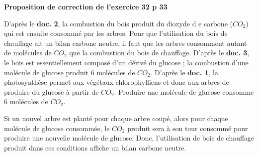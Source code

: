 	\begin{center}
		{\LARGE \textbf{Proposition de correction de l'exercice 32 p 33}}
	\end{center}
	
	
	D'après le \textbf{doc. 2}, la combustion du bois produit du dioxyde d e carbone ($CO_2$) qui est ensuite consommé par les arbres. Pour que l'utilisation du bois de chauffage ait un bilan carbone neutre, il faut que les arbres consomment autant de molécules de $CO_2$ que la combustion du bois de chauffage.	
	D'après le \textbf{doc. 3}, le bois est essentiellement composé d'un dérivé du glucose ; la combustion d'une molécule de glucose produit 6 molécules de $CO_2$. 
	D'après le \textbf{doc. 1}, la photosynthèse permet aux végétaux chlorophylliens et donc aux arbres de produire du glucose à partir de $CO_2$. Produire une molécule de glucose consomme 6 molécules de $CO_2$.
	
	Si un nouvel arbre est planté pour chaque arbre coupé, alors pour chaque molécule de glucose consommée, le $CO_2$ produit sera à son tour consommé pour produire une nouvelle molécule de glucose. Donc, l'utilisation de bois de chauffage produit dans ces conditions affiche un bilan carbone neutre.